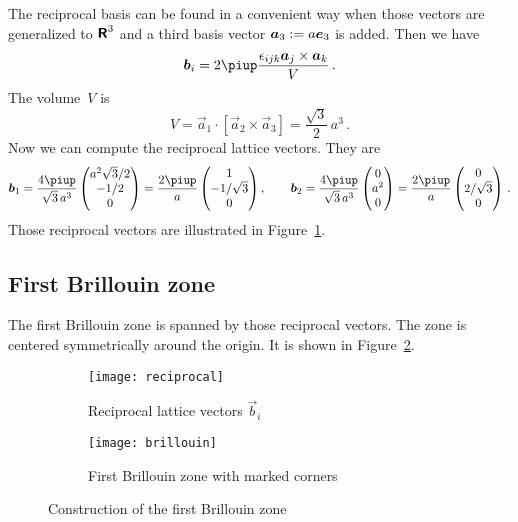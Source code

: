 \documentclass[11pt, english, fleqn, DIV=15, headinclude, BCOR=1cm]{scrartcl}
\begin{document}
The reciprocal basis can be found in a convenient way when those vectors are
generalized to $\text{\bfseries\sffamily R}^3$ and a third basis vector $\vec a_3 := a\ev_3$ is added.
Then we have
\[
    \vec b_i = 2\piup \frac{\epsilon_{ijk} \vec a_j \times \vec a_k}{V} \,.
\]
The volume~$V$ is
\[
    V = \vec a_1 \cdot [\vec a_2 \times \vec a_3]
    = \frac{\sqrt 3}{2} \, a^3 \,.
\]
Now we can compute the reciprocal lattice vectors. They are
\[
    \vec b_1 = \frac{4 \piup}{\sqrt 3 \, a^3}
    \begin{pmatrix}
        a^2 \sqrt 3/2 \\ -1/2 \\ 0
    \end{pmatrix}
    =
    \frac{2\piup}{a}
    \begin{pmatrix}
        1 \\ - 1 / \sqrt 3 \\ 0
    \end{pmatrix}
    \eqnsep
    \vec b_2 = \frac{4 \piup}{\sqrt 3 \, a^3}
    \begin{pmatrix}
        0 \\ a^2 \\ 0
    \end{pmatrix}
    =
    \frac{2\piup}{a}
    \begin{pmatrix}
        0 \\ 2 / \sqrt 3 \\ 0
    \end{pmatrix} \,.
\]
Those reciprocal vectors are illustrated in Figure~\ref{fig:reciprocal}.

\subsection{First Brillouin zone}

The first Brillouin zone is spanned by those reciprocal vectors. The zone is
centered symmetrically around the origin. It is shown in
Figure~\ref{fig:brillouin}.

\begin{figure}[htbp]
    \begin{subfigure}[b]{0.5\linewidth}
        \centering
        \texttt{[image: reciprocal]}
        \caption{%
            Reciprocal lattice vectors $\vec b_i$
        }
        \label{fig:reciprocal}
    \end{subfigure}
    \begin{subfigure}[b]{0.5\linewidth}
        \centering
        \texttt{[image: brillouin]}
        \caption{%
            First Brillouin zone with marked corners
        }
        \label{fig:brillouin}
    \end{subfigure}
    \caption{%
        Construction of the first Brillouin zone
    }
    \label{fig:brillouin-zone}
\end{figure}
\end{document}
